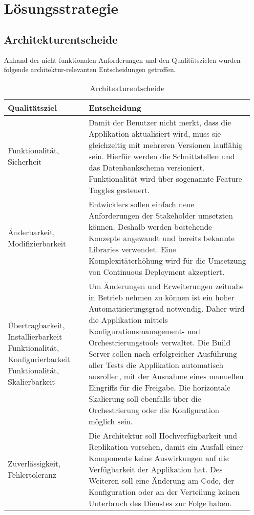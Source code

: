 \chapter{Lösungsstrategie}

\section{Architekturentscheide}

Anhand der nicht funktionalen Anforderungen und den Qualitätszielen wurden folgende architektur-relevanten Entscheidungen getroffen.

\begin{table}[H]
	\centering
	\caption{Architekturentscheide}
	\begin{tabular}{ | p{4cm} | p{11cm} | }
		\toprule
		{\textbf{Qualitätsziel}} & {\textbf{Entscheidung}} \\
		\midrule
		Funktionalität, Sicherheit &  Damit der Benutzer nicht merkt, dass die Applikation aktualisiert wird, muss sie gleichzeitig mit mehreren Versionen lauffähig sein. Hierfür werden die Schnittstellen und das Datenbankschema versioniert. Funktionalität wird über sogenannte Feature Toggles gesteuert.\\ \hline
		Änderbarkeit, Modifizierbarkeit & Entwicklers sollen einfach neue Anforderungen der Stakeholder umsetzten können. Deshalb werden bestehende Konzepte angewandt und bereits bekannte Libraries verwendet. Eine Komplexitäterhöhung wird für die Umsetzung von Continuous Deployment akzeptiert. \\ \hline
		Übertragbarkeit, Installierbarkeit \newline Funktionalität, Konfigurierbarkeit \newline Funktionalität, Skalierbarkeit & Um Änderungen und Erweiterungen zeitnahe in Betrieb nehmen zu können ist ein hoher Automatisierungsgrad notwendig. Daher wird die Applikation mittels Konfigurationsmanagement- und Orchestrierungstools verwaltet. Die Build Server sollen nach erfolgreicher Ausführung aller Tests die Applikation automatisch ausrollen, mit der Ausnahme eines manuellen Eingriffs für die Freigabe. Die horizontale Skalierung soll ebenfalls über die Orchestrierung oder die Konfiguration möglich sein.\\ \hline
		Zuverlässigkeit, Fehlertoleranz &  Die Architektur soll Hochverfügbarkeit und Replikation vorsehen, damit ein Ausfall einer Komponente keine Auswirkungen auf die Verfügbarkeit der Applikation hat. Des Weiteren soll eine Änderung am Code, der Konfiguration oder an der Verteilung keinen Unterbruch des Dienstes zur Folge haben.\\
		\bottomrule
	\end{tabular}
\end{table}
\newpage
